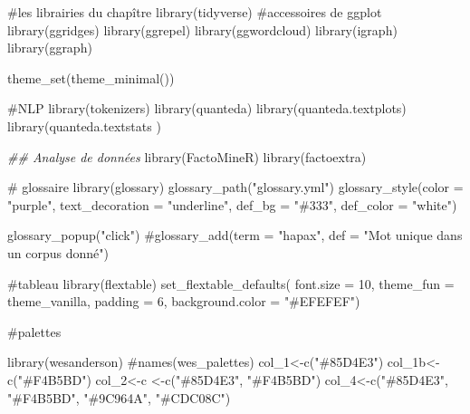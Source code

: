 \documentclass[
  letterpaper,
  DIV=11,
  numbers=noendperiod]{scrreprt}
\newenvironment{Shaded}{\begin{snugshade}}{\end{snugshade}}
\newcommand{\AttributeTok}[1]{\textcolor[rgb]{0.40,0.45,0.13}{#1}}
\newcommand{\CommentTok}[1]{\textcolor[rgb]{0.37,0.37,0.37}{#1}}
\newcommand{\DecValTok}[1]{\textcolor[rgb]{0.68,0.00,0.00}{#1}}
\newcommand{\DocumentationTok}[1]{\textcolor[rgb]{0.37,0.37,0.37}{\textit{#1}}}
\newcommand{\FunctionTok}[1]{\textcolor[rgb]{0.28,0.35,0.67}{#1}}
\newcommand{\NormalTok}[1]{\textcolor[rgb]{0.00,0.23,0.31}{#1}}
\newcommand{\OtherTok}[1]{\textcolor[rgb]{0.00,0.23,0.31}{#1}}
\newcommand{\StringTok}[1]{\textcolor[rgb]{0.13,0.47,0.30}{#1}}
\begin{document}
\begin{Shaded}
\begin{Highlighting}[]
\CommentTok{\#les librairies du chapître}
\FunctionTok{library}\NormalTok{(tidyverse)}
\CommentTok{\#accessoires de ggplot}
\FunctionTok{library}\NormalTok{(ggridges)}
\FunctionTok{library}\NormalTok{(ggrepel)}
\FunctionTok{library}\NormalTok{(ggwordcloud)}
\FunctionTok{library}\NormalTok{(igraph)}
\FunctionTok{library}\NormalTok{(ggraph)}

\FunctionTok{theme\_set}\NormalTok{(}\FunctionTok{theme\_minimal}\NormalTok{()) }

\CommentTok{\#NLP}
\FunctionTok{library}\NormalTok{(tokenizers)}
\FunctionTok{library}\NormalTok{(quanteda)}
\FunctionTok{library}\NormalTok{(quanteda.textplots)}
\FunctionTok{library}\NormalTok{(quanteda.textstats )}

\DocumentationTok{\#\# Analyse de données}
\FunctionTok{library}\NormalTok{(FactoMineR)}
\FunctionTok{library}\NormalTok{(factoextra)}

\CommentTok{\# glossaire}
\FunctionTok{library}\NormalTok{(glossary)}
\FunctionTok{glossary\_path}\NormalTok{(}\StringTok{"glossary.yml"}\NormalTok{)}
\FunctionTok{glossary\_style}\NormalTok{(}\AttributeTok{color =} \StringTok{"purple"}\NormalTok{, }
               \AttributeTok{text\_decoration =} \StringTok{"underline"}\NormalTok{,}
               \AttributeTok{def\_bg =} \StringTok{"\#333"}\NormalTok{,}
               \AttributeTok{def\_color =} \StringTok{"white"}\NormalTok{)}
\end{Highlighting}
\end{Shaded}

\begin{Shaded}
\begin{Highlighting}[]
\FunctionTok{glossary\_popup}\NormalTok{(}\StringTok{"click"}\NormalTok{)}
\CommentTok{\#glossary\_add(term = "hapax", def = "Mot unique dans un corpus donné")}

\CommentTok{\#tableau}
\FunctionTok{library}\NormalTok{(flextable)}
\FunctionTok{set\_flextable\_defaults}\NormalTok{(}
  \AttributeTok{font.size =} \DecValTok{10}\NormalTok{, }\AttributeTok{theme\_fun =}\NormalTok{ theme\_vanilla,}
  \AttributeTok{padding =} \DecValTok{6}\NormalTok{,}
  \AttributeTok{background.color =} \StringTok{"\#EFEFEF"}\NormalTok{)}

\CommentTok{\#palettes}

\FunctionTok{library}\NormalTok{(wesanderson)}
\CommentTok{\#names(wes\_palettes)}
\NormalTok{col\_1}\OtherTok{\textless{}{-}}\FunctionTok{c}\NormalTok{(}\StringTok{"\#85D4E3"}\NormalTok{)}
\NormalTok{col\_1b}\OtherTok{\textless{}{-}}\FunctionTok{c}\NormalTok{(}\StringTok{"\#F4B5BD"}\NormalTok{)}
\NormalTok{col\_2}\OtherTok{\textless{}{-}}\NormalTok{c }\OtherTok{\textless{}{-}}\FunctionTok{c}\NormalTok{(}\StringTok{"\#85D4E3"}\NormalTok{, }\StringTok{"\#F4B5BD"}\NormalTok{)}
\NormalTok{col\_4}\OtherTok{\textless{}{-}}\FunctionTok{c}\NormalTok{(}\StringTok{"\#85D4E3"}\NormalTok{, }\StringTok{"\#F4B5BD"}\NormalTok{, }\StringTok{"\#9C964A"}\NormalTok{, }\StringTok{"\#CDC08C"}\NormalTok{)}
\end{Highlighting}
\end{Shaded}
\end{document}

